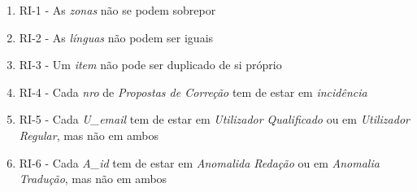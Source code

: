 \documentclass[12pt]{report}
\begin{document}
\normalsize
\begin{enumerate}
    \item RI-1 - As \textit{zonas} não se podem sobrepor
    \item RI-2 - As \textit{línguas} não podem ser iguais
    \item RI-3 - Um \textit{item} não pode ser duplicado de si próprio
    \item RI-4 - Cada \textit{nro} de \textit{Propostas de Correção} tem de estar em \textit{incidência}
    \item RI-5 - Cada \textit{U\_email} tem de estar em \textit{Utilizador Qualificado} ou em \textit{Utilizador Regular}, mas não em ambos
    \item RI-6 - Cada \textit{A\_id} tem de estar em \textit{Anomalida Redação} ou em \textit{Anomalia Tradução}, mas não em ambos
    
\end{enumerate}
\end{document}
